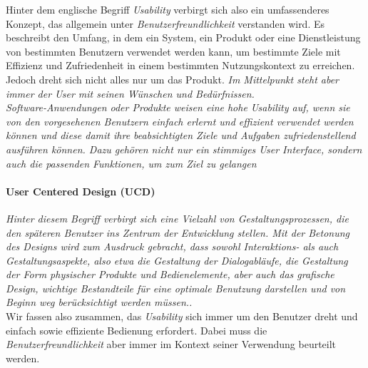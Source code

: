 Hinter dem englische Begriff \textit{Usability} verbirgt sich also ein umfassenderes Konzept, das allgemein unter \textit{Benutzerfreundlichkeit} verstanden wird. Es beschreibt den Umfang, in dem ein System, ein Produkt oder eine Dienstleistung von bestimmten Benutzern verwendet werden kann, um bestimmte Ziele mit Effizienz und Zufriedenheit in einem bestimmten Nutzungskontext zu erreichen. Jedoch dreht sich nicht alles nur um das Produkt. \textit{\glqq Im Mittelpunkt steht aber immer der User mit seinen Wünschen und Bedürfnissen.\grqq} \cite{von_gizycki_usability_2002}\\

\textit{\glqq Software-Anwendungen oder Produkte weisen eine hohe Usability auf, wenn sie von den vorgesehenen Benutzern einfach erlernt und effizient verwendet werden können und diese damit ihre beabsichtigten Ziele und Aufgaben zufriedenstellend ausführen können. Dazu gehören nicht nur ein stimmiges User Interface, sondern auch die passenden Funktionen, um zum Ziel zu gelangen\grqq} \cite{richter_usability_2016}\\

\paragraph{User Centered Design (UCD)}
\textit{\glqq Hinter diesem Begriff verbirgt sich eine Vielzahl von Gestaltungsprozessen, die den späteren Benutzer ins Zentrum der Entwicklung stellen. Mit der Betonung des Designs wird zum Ausdruck gebracht, dass sowohl Interaktions- als auch Gestaltungsaspekte, also etwa die Gestaltung der Dialogabläufe, die Gestaltung der Form physischer Produkte und Bedienelemente, aber auch das grafische Design, wichtige Bestandteile für eine optimale Benutzung darstellen und von Beginn weg berücksichtigt werden müssen..\grqq} \cite{richter_usability_2016}\\

Wir fassen also zusammen, das \textit{Usability} sich immer um den Benutzer dreht und einfach sowie effiziente Bedienung erfordert. Dabei muss die \textit{Benutzerfreundlichkeit} aber immer im Kontext seiner Verwendung beurteilt werden.
%
%
%
%
%
